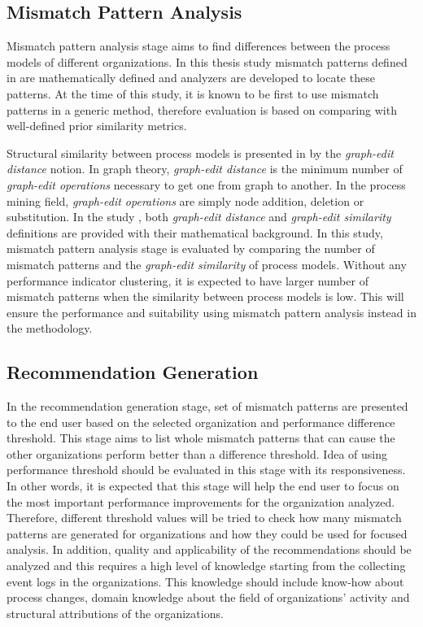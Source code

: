  

\subsection{Mismatch Pattern Analysis}
\label{subsec:mismatch-pattern-analysis-eval}
Mismatch pattern analysis stage aims to find differences between the process models of different organizations. In this thesis study mismatch patterns defined in \cite{dijkman2007mismatch} are mathematically defined and analyzers are developed to locate these patterns. At the time of this study, it is known to be first to use mismatch patterns in a generic method, therefore evaluation is based on comparing with well-defined prior similarity metrics.

Structural similarity between process models is presented in \cite{dijkman2011similarity} by the \textit{graph-edit distance} notion. In graph theory, \textit{graph-edit distance} is the minimum number of \textit{graph-edit operations} necessary to get one from graph to another. In the process mining field, \textit{graph-edit operations} are simply node addition, deletion or substitution. In the study \cite{dijkman2011similarity}, both \textit{graph-edit distance} and \textit{graph-edit similarity} definitions are provided with their mathematical background. In this study, mismatch pattern analysis stage is evaluated by comparing the number of mismatch patterns and the \textit{graph-edit similarity} of process models. Without any performance indicator clustering, it is expected to have larger number of mismatch patterns when the similarity between process models is low. This will ensure the performance and suitability using mismatch pattern analysis instead in the methodology.


\subsection{Recommendation Generation}
\label{subsec:recommendation-generation-eval}
In the recommendation generation stage, set of mismatch patterns are presented to the end user based on the selected organization and performance difference threshold. This stage aims to list whole mismatch patterns that can cause the other organizations perform better than a difference threshold. Idea of using performance threshold should be evaluated in this stage with its responsiveness. In other words, it is expected that this stage will help the end user to focus on the most important performance improvements for the organization analyzed. Therefore, different threshold values will be tried to check how many mismatch patterns are generated for organizations and how they could be used for focused analysis. In addition, quality and applicability of the recommendations should be analyzed and this requires a high level of knowledge starting from the collecting event logs in the organizations. This knowledge should include know-how about process changes, domain knowledge about the field of organizations' activity and structural attributions of the organizations.

